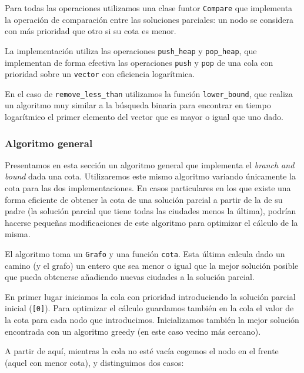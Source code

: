 

Para todas las operaciones utilizamos una clase funtor \texttt{Compare} que implementa
la operación de comparación entre las soluciones parciales: un nodo se considera con más prioridad que otro si su cota es menor.

La implementación utiliza las operaciones \texttt{push\_heap} y \texttt{pop\_heap}, que implementan
de forma efectiva las operaciones \texttt{push} y \texttt{pop} de una cola con prioridad sobre un \texttt{vector} con eficiencia logarítmica.

En el caso de \texttt{remove\_less\_than} utilizamos la función \texttt{lower\_bound},
que realiza un algoritmo muy similar a la búsqueda binaria para encontrar en tiempo
logarítmico el primer elemento del vector que es mayor o igual que uno dado.

\subsubsection{Algoritmo general}

Presentamos en esta sección un algoritmo general que implementa el \textit{branch and bound} dada una cota. Utilizaremos este mismo algoritmo variando únicamente la cota para las dos implementaciones. En casos particulares en los que existe una forma eficiente de obtener la cota de una solución parcial a partir de la de su padre (la solución parcial que tiene todas las ciudades menos la última), podrían hacerse pequeñas modificaciones de este algoritmo para optimizar el cálculo de la misma.

El algoritmo toma un \texttt{Grafo} y una función \texttt{cota}. Esta última calcula dado un camino (y el grafo) un entero que sea menor o igual que la mejor solución posible que pueda obtenerse añadiendo nuevas ciudades a la solución parcial.

En primer lugar iniciamos la cola con prioridad introduciendo la solución parcial
inicial (\texttt{[0]}). Para optimizar el cálculo guardamos también en la cola el valor de la cota para cada nodo que introducimos. Inicializamos también la mejor solución encontrada con un algoritmo greedy (en este caso vecino más cercano).


A partir de aquí, mientras la cola no esté vacía cogemos el nodo en el frente (aquel con menor cota), y distinguimos dos casos:

